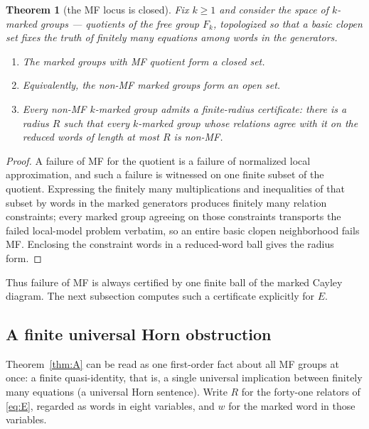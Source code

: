 \documentclass[11pt]{amsart}
\newcommand{\leanverified}[2]{\ignorespaces}
\newtheorem{theorem}{Theorem}[section]
\theoremstyle{definition}
\theoremstyle{remark}
\theoremstyle{plain}
\begin{document}
\begin{theorem}[the MF locus is closed]\label{thm:markedclosed}
Fix $k\ge1$ and consider the space of $k$-marked groups --- quotients
of the free group $F_k$, topologized so that a basic clopen set fixes
the truth of finitely many equations among words in the generators.
\begin{enumerate}
\item The marked groups with MF quotient form a closed set.
\item Equivalently, the non-MF marked groups form an open set.
\item Every non-MF $k$-marked group admits a finite-radius
certificate: there is a radius $R$ such that every $k$-marked group
whose relations agree with it on the reduced words of length at most
$R$ is non-MF.
\leanverified{Sofic/MarkedMFClosed}{GroupApproximation.MarkedGroupSpace.isClosed_operatorMFLocus}
\leanverified{Sofic/MarkedMFClosed}{GroupApproximation.MarkedGroupSpace.isOpen_compl_operatorMFLocus}
\leanverified{Sofic/MarkedMFClosed}{GroupApproximation.MarkedGroupSpace.exists_wordBall_cylinder_subset_compl_operatorMFLocus}
\end{enumerate}
\end{theorem}

\begin{proof}
A failure of MF for the quotient is a failure of normalized local
approximation, and such a failure is witnessed on one finite subset of
the quotient.  Expressing the finitely many multiplications and
inequalities of that subset by words in the marked generators produces
finitely many relation constraints; every marked group agreeing on
those constraints transports the failed local-model problem verbatim,
so an entire basic clopen neighborhood fails MF\@.  Enclosing the
constraint words in a reduced-word ball gives the radius form.
\end{proof}

Thus failure of MF is always certified by one finite ball of the
marked Cayley diagram.  The next subsection computes such a
certificate explicitly for $E$.

\subsection{A finite universal Horn obstruction}

Theorem~\ref{thm:A} can be read as one first-order fact about all MF
groups at once: a finite quasi-identity, that is, a single universal
implication between finitely many equations (a universal Horn
sentence).  Write $R$ for the forty-one relators of \eqref{eq:E},
regarded as words in eight variables, and $w$ for the marked word in those
variables.
\end{document}
